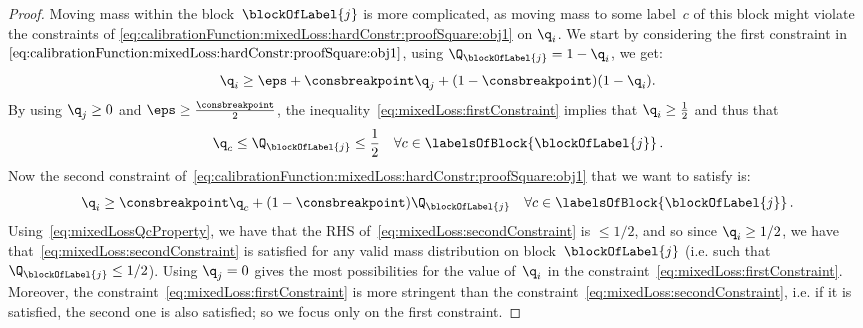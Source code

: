 \documentclass{article}
\begin{document}
\begin{proof}
    Moving mass within the block~$\blockOfLabel{j}$ is more complicated, as moving mass to some label~$c$ of this block might violate the constraints of \eqref{eq:calibrationFunction:mixedLoss:hardConstr:proofSquare:obj1} 
    on $\q_i$. We start by considering the first constraint in~$\eqref{eq:calibrationFunction:mixedLoss:hardConstr:proofSquare:obj1}$, using $\Q_{\blockOfLabel{j}}=1-\q_i$, we get:
    \begin{equation}
    \label{eq:mixedLoss:firstConstraint}
    \q_i \geq \eps + \consbreakpoint \q_j + (1-\consbreakpoint)(1-\q_i).
    \end{equation}
    By using $\q_j \geq 0$ and $\eps \geq \frac{\consbreakpoint}{2}$, the inequality~\eqref{eq:mixedLoss:firstConstraint} implies that $\q_i \geq \frac{1}{2}$ and thus that 
    \begin{equation}
    \label{eq:mixedLossQcProperty}
    \q_c \leq \Q_{\blockOfLabel{j}} \leq \frac{1}{2} \quad \forall c \in  \labelsOfBlock{\blockOfLabel{j}} \, .
    \end{equation}
    Now the second constraint of~\eqref{eq:calibrationFunction:mixedLoss:hardConstr:proofSquare:obj1} that we want to satisfy is:
    \begin{equation}
        \label{eq:mixedLoss:secondConstraint}
        \q_i \geq \consbreakpoint \q_c + (1-\consbreakpoint)\Q_{\blockOfLabel{j}} \quad \forall c \in  \labelsOfBlock{\blockOfLabel{j}} \, .
    \end{equation}
    Using~\eqref{eq:mixedLossQcProperty}, we have that the RHS of~\eqref{eq:mixedLoss:secondConstraint} is $\leq 1/2$, and so since $\q_i \geq 1/2$, we have that~\eqref{eq:mixedLoss:secondConstraint} is satisfied for any valid mass distribution on block~$\blockOfLabel{j}$ (i.e. such that $\Q_{\blockOfLabel{j}} \leq 1/2$). Using $\q_j = 0$ gives the most possibilities for the value of~$\q_i$ in the constraint~\eqref{eq:mixedLoss:firstConstraint}. Moreover, the constraint~\eqref{eq:mixedLoss:firstConstraint} is more stringent than the constraint~\eqref{eq:mixedLoss:secondConstraint}, i.e. if it is satisfied, the second one is also satisfied; so we focus only on the first constraint.
    

\end{proof}
\end{document}
